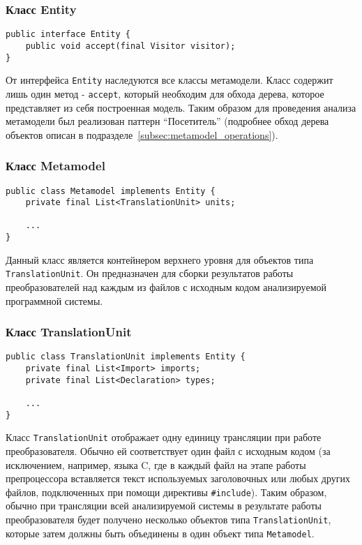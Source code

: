 \subsubsection{Класс Entity}

\begin{lstlisting}[caption={Интерфейс Entity}]
public interface Entity {
    public void accept(final Visitor visitor);
}
\end{lstlisting}

От интерфейса \texttt{Entity} наследуются все классы метамодели. Класс содержит
лишь один метод - \texttt{accept}, который необходим для обхода дерева, которое
представляет из себя построенная модель. Таким образом для проведения анализа
метамодели был реализован паттерн ``Посетитель'' (подробнее обход дерева
объектов описан в подразделе~\ref{subsec:metamodel_operations}).

\vspace{10pt}
\subsubsection{Класс Metamodel}

\begin{lstlisting}[caption={Класс Metamodel}]
public class Metamodel implements Entity {
    private final List<TranslationUnit> units;

    ...
}
\end{lstlisting}

Данный класс является контейнером верхнего уровня для объектов типа
\texttt{TranslationUnit}. Он предназначен для сборки результатов работы
преобразователей над каждым из файлов с исходным кодом анализируемой программной
системы.

\vspace{10pt}
\subsubsection{Класс TranslationUnit}

\begin{lstlisting}[caption={Класс TranslationUnit}]
public class TranslationUnit implements Entity {
    private final List<Import> imports;
    private final List<Declaration> types;

    ...
}
\end{lstlisting}

Класс \texttt{TranslationUnit} отображает одну единицу трансляции при работе
преобразователя. Обычно ей соответствует один файл с исходным кодом (за
исключением, например, языка C, где в каждый файл на этапе работы препроцессора
вставляется текст используемых заголовочных или любых других файлов,
подключенных при помощи директивы \texttt{\#include}). Таким образом, обычно при
трансляции всей анализируемой системы в результате работы преобразователя
будет получено несколько объектов типа \texttt{TranslationUnit}, которые затем
должны быть объединены в один объект типа \texttt{Metamodel}.

